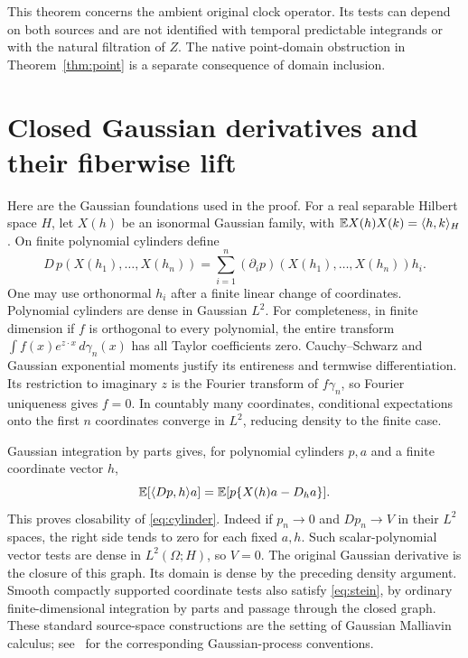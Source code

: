 \documentclass[11pt]{article}
\begin{document}
This theorem concerns the ambient original clock
operator. Its tests can depend on both sources and are
not identified with temporal predictable integrands or
with the natural filtration of $Z$. The native
point-domain obstruction in Theorem~\ref{thm:point}
is a separate consequence of domain inclusion.

\section{Closed Gaussian derivatives and their fiberwise lift}
\label{sec:gaussian}
Here are the Gaussian foundations used in the proof.
For a real separable Hilbert space $H$, let $X(h)$ be an
isonormal Gaussian family, with
$\mathbb E X(h)X(k)=\langle h,k\rangle_H$.
On finite polynomial cylinders define
\begin{equation}\label{eq:cylinder}
 D\,p(X(h_1),\ldots,X(h_n))
   =\sum_{i=1}^n(\partial_i p)(X(h_1),\ldots,X(h_n))h_i.
\end{equation}
One may use orthonormal $h_i$ after a finite linear
change of coordinates. Polynomial cylinders are dense
in Gaussian $L^2$. For completeness, in finite dimension
if $f$ is orthogonal to every polynomial, the entire
transform $\int f(x)e^{z\cdot x}\,d\gamma_n(x)$ has
all Taylor coefficients zero. Cauchy--Schwarz and
Gaussian exponential moments justify its entireness and
termwise differentiation. Its restriction to imaginary
$z$ is the Fourier transform of $f\gamma_n$, so Fourier
uniqueness gives $f=0$. In countably many coordinates,
conditional expectations onto the first $n$ coordinates
converge in $L^2$, reducing density to the finite case.

Gaussian integration by parts gives, for polynomial
cylinders $p,a$ and a finite coordinate vector $h$,
\begin{equation}\label{eq:stein}
 \mathbb E[\langle Dp,h\rangle a]
 =\mathbb E[p\{X(h)a-D_h a\}].
\end{equation}
This proves closability of \eqref{eq:cylinder}.
Indeed if $p_n\to0$ and $Dp_n\to V$ in their $L^2$
spaces, the right side tends to zero for each fixed
$a,h$. Such scalar-polynomial vector tests are dense
in $L^2(\Omega;H)$, so $V=0$.
The original Gaussian derivative is the closure of this
graph. Its domain is dense by the preceding density
argument. Smooth compactly supported coordinate tests
also satisfy \eqref{eq:stein}, by ordinary finite-dimensional
integration by parts and passage through the closed graph.
These standard source-space constructions are the setting
of Gaussian Malliavin calculus; see~\cite{sottinen} for
the corresponding Gaussian-process conventions.
\end{document}
